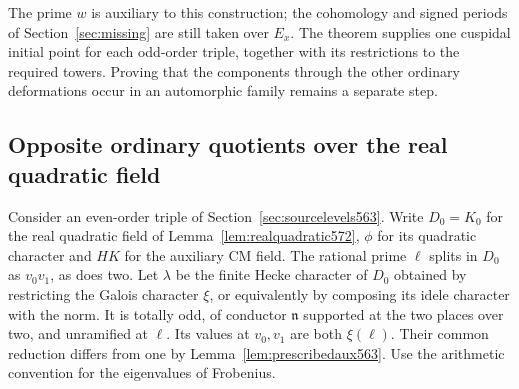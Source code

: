 \documentclass[a4paper,11pt]{article}
\theoremstyle{definition}
\theoremstyle{remark}
\numberwithin{equation}{section}
\begin{document}
The prime \(w\) is auxiliary to this construction; the
cohomology and signed periods of Section~\ref{sec:missing}
are still taken over \(E_x\). The theorem supplies one
cuspidal initial point for each odd-order triple, together
with its restrictions to the required towers. Proving that
the components through the other ordinary deformations
occur in an automorphic family remains a separate step.


\subsection{Opposite ordinary quotients over the real quadratic field}
\label{sec:oppositequotients578}

Consider an even-order triple of Section~\ref{sec:sourcelevels563}.
Write \(D_0=K_0\) for the real quadratic field of
Lemma~\ref{lem:realquadratic572}, \(\phi\) for its quadratic
character and \(HK\) for the auxiliary CM field. The rational
prime \(\ell\) splits in \(D_0\) as \(v_0v_1\), as does two.
Let \(\lambda\) be the finite Hecke character of \(D_0\)
obtained by restricting the Galois character \(\xi\), or
equivalently by composing its idele character with the norm.
It is totally odd, of conductor \(\mathfrak n\) supported
at the two places over two, and unramified at \(\ell\).
Its values at \(v_0,v_1\) are both \(\xi(\ell)\). Their common
reduction differs from one by Lemma~\ref{lem:prescribedaux563}.
Use the arithmetic convention for the eigenvalues of Frobenius.
\end{document}
